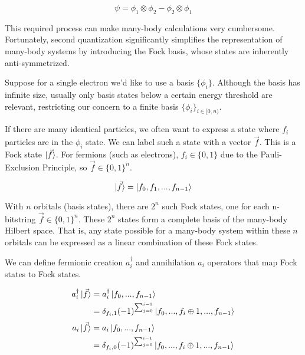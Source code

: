 \begin{equation}
    \psi = \phi_1 \otimes \phi_2 - \phi_2 \otimes \phi_1
\end{equation}

This required process can make many-body calculations very cumbersome. Fortunately, second quantization significantly simplifies the representation of many-body systems by introducing the Fock basis, whose states are inherently anti-symmetrized.

Suppose for a single electron we'd like to use a basis $\{\phi_i\}$. Although the basis has infinite size, usually only basis states below a certain energy threshold are relevant, restricting our concern to a finite basis $\{\phi_i\}_{i \in [0, n)}$.

If there are many identical particles, we often want to express a state where $f_i$ particles are in the $\phi_i$ state. We can label such a state with a vector $\vec{f}$. This is a Fock state $\ket{\vec{f}}$. For fermions (such as electrons), $f_i \in \{0, 1\}$ due to the Pauli-Exclusion Principle, so $\vec{f} \in \{0, 1\}^n$.

\begin{equation}
    \ket{\vec{f}} = \ket{f_0, f_1, ..., f_{n - 1}} \label{eq: fock}
\end{equation}

With $n$ orbitals (basis states), there are $2^n$ such Fock states, one for each n-bitstring $\vec{f} \in \{0, 1\}^n$. These $2^n$ states form a complete basis of the many-body Hilbert space. That is, any state possible for a many-body system within these $n$ orbitals can be expressed as a linear combination of these Fock states.

We can define fermionic creation $a^\dag_i$ and annihilation $a_i$ operators that map Fock states to Fock states.

\begin{equation}
    \begin{split}
        a^\dag_i\ket{\vec{f}} &= a^\dag_i\ket{f_0, ..., f_{n - 1}} \\
        &= \delta_{f_i, 1}(-1)^{\sum_{j = 0}^{i - 1}}\ket{f_0, ..., f_i \oplus 1, ..., f_{n - 1}}
    \end{split}
    \label{eq: creation}
\end{equation}
\begin{equation}
    \begin{split}
        a_i\ket{\vec{f}} &= a_i\ket{f_0, ..., f_{n - 1}} \\
        &= \delta_{f_i, 0}(-1)^{\sum_{j = 0}^{i - 1}}\ket{f_0, ..., f_i \oplus 1, ..., f_{n - 1}}
    \end{split}
    \label{eq: annihilation}
\end{equation}

